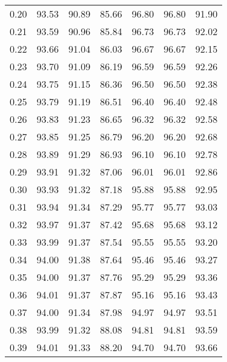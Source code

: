 \begin{tabular}{|c|c|c|c|c|c|c|}
      0.20 &     93.53 &     90.89 &      85.66 &   96.80 &      96.80 &         91.90 \\
      0.21 &     93.59 &     90.96 &      85.84 &   96.73 &      96.73 &         92.02 \\
      0.22 &     93.66 &     91.04 &      86.03 &   96.67 &      96.67 &         92.15 \\
      0.23 &     93.70 &     91.09 &      86.19 &   96.59 &      96.59 &         92.26 \\
      0.24 &     93.75 &     91.15 &      86.36 &   96.50 &      96.50 &         92.38 \\
      0.25 &     93.79 &     91.19 &      86.51 &   96.40 &      96.40 &         92.48 \\
      0.26 &     93.83 &     91.23 &      86.65 &   96.32 &      96.32 &         92.58 \\
      0.27 &     93.85 &     91.25 &      86.79 &   96.20 &      96.20 &         92.68 \\
      0.28 &     93.89 &     91.29 &      86.93 &   96.10 &      96.10 &         92.78 \\
      0.29 &     93.91 &     91.32 &      87.06 &   96.01 &      96.01 &         92.86 \\
      0.30 &     93.93 &     91.32 &      87.18 &   95.88 &      95.88 &         92.95 \\
      0.31 &     93.94 &     91.34 &      87.29 &   95.77 &      95.77 &         93.03 \\
      0.32 &     93.97 &     91.37 &      87.42 &   95.68 &      95.68 &         93.12 \\
      0.33 &     93.99 &     91.37 &      87.54 &   95.55 &      95.55 &         93.20 \\
      0.34 &     94.00 &     91.38 &      87.64 &   95.46 &      95.46 &         93.27 \\
      0.35 &     94.00 &     91.37 &      87.76 &   95.29 &      95.29 &         93.36 \\
      0.36 &     94.01 &     91.37 &      87.87 &   95.16 &      95.16 &         93.43 \\
      0.37 &     94.00 &     91.34 &      87.98 &   94.97 &      94.97 &         93.51 \\
      0.38 &     93.99 &     91.32 &      88.08 &   94.81 &      94.81 &         93.59 \\
      0.39 &     94.01 &     91.33 &      88.20 &   94.70 &      94.70 &         93.66 \\

\end{tabular}
